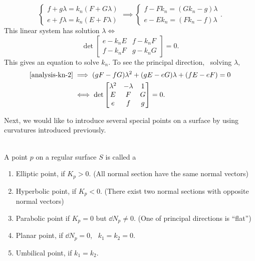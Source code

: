 \begin{enumerate}[(1)]
\[\begin{cases}
                f+g\lambda=k_n(F+G\lambda) \\
                e+f\lambda=k_n(E+F\lambda)
            \end{cases}\implies \begin{cases}
            f-Fk_n=(Gk_n-g)\lambda \\
            e-Ek_n=(Fk_n-f)\lambda
            \end{cases}
        .\] This linear system has solution \(\lambda\iff \) \[
            \det\begin{bmatrix}
                e-k_n E & f-k_n F \\
                f-k_n F & g-k_n G
            \end{bmatrix}=0
        .\] This gives an equation to solve \(k_n\).
        To see the principal direction, \ie\ solving \(\lambda\),
        \begin{align*}
            \text{\cref{analysis-kn-2}}
            &\implies (gF-fG)\lambda^2+(gE-eG)\lambda+(fE-eF)=0 \\
            &\iff \det\begin{bmatrix}
                \lambda^2 & -\lambda & 1 \\
                E & F & G \\
                e & f & g
            \end{bmatrix}=0
        .\end{align*}
\end{enumerate}

Next, we would like to introduce several special points on a surface by using
curvatures introduced previously.

\begin{definition}\hfill\\
    A point \(p\) on a regular surface \(S\) is called a
\begin{enumerate}[(1)]
    \item Elliptic point, if \(K_p>0\).
        (All normal section have the same normal vectors)
    \item Hyperbolic point, if \(K_p<0\).
        (There exist two normal sections with opposite normal vectors)
    \item Parabolic point if \(K_p=0\) but \(\dd{N}_p\neq 0\).
        (One of principal directions is ``flat'')
    \item Planar point, if \(\dd{N}_p=0\), \ie\ \(k_1=k_2=0\).
    \item Umbilical point, if \(k_1=k_2\).
\end{enumerate}
\end{definition}


